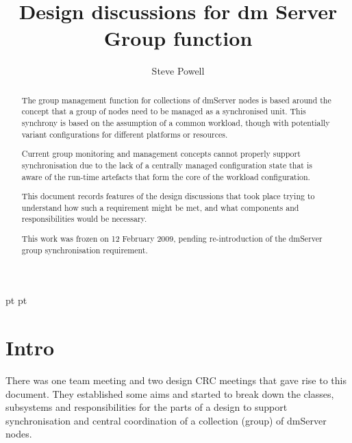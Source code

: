 \documentclass[a4paper,12pt]{article}
\begin{document}
 pt
 pt

\title{Design discussions for dm Server Group function}
\author{Steve Powell}
\maketitle
\thispagestyle{myheadings}
\setcounter{page}{0}

\begin{abstract}
The group management function for collections of dmServer nodes is based around the concept that a
group of nodes need to be managed as a synchronised unit. This synchrony is based on the assumption of a common workload, though with potentially variant configurations for different platforms or resources.

Current group monitoring and management concepts cannot properly support synchronisation due to the lack of a centrally managed configuration state that is aware of the run-time artefacts that form the core  of the workload configuration.

This document records features of the design discussions that took place trying to understand how such a requirement might be met, and what components and responsibilities would be necessary. 

This work was frozen on 12 February 2009, pending re-introduction of the dmServer group synchronisation requirement.
\end{abstract}


\newcommand{\true}{true}
\newcommand{\false}{false}
\renewcommand{\emptyset}{\varnothing}
\newcommand{\ModuleDefZero}{ModuleDef_0}
\newcommand{\ModuleDefOne}{ModuleDef_1}
\newcommand{\ModuleDefTwo}{ModuleDef_2}
\newcommand{\ModuleDefThree}{ModuleDef_3}
\newcommand{\ModuleDefFour}{ModuleDef_4}


\clearpage
\tableofcontents

\clearpage
{}
\section{Intro}
There was one team meeting and two design CRC meetings that gave rise to this document. They established some aims and started to break down the 
classes, subsystems and responsibilities for the parts of a design to support synchronisation and central coordination of a collection (group) of dmServer nodes.
\end{document}

